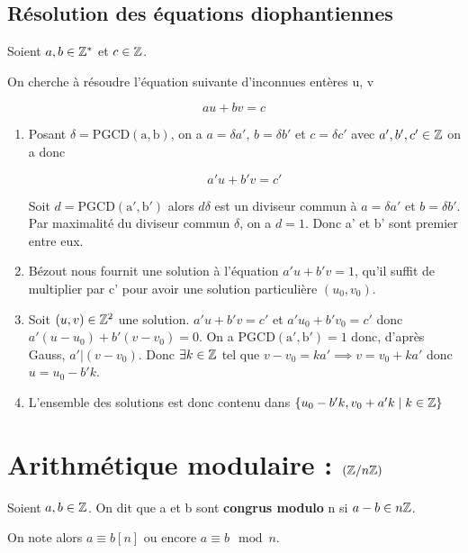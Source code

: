 \documentclass[a4paper, 12pt]{article}
\begin{document}
\subsection{Résolution des équations diophantiennes}

Soient $a, b \in \mathbb{Z}^*$ et $c \in \mathbb{Z}$.

On cherche à résoudre l'équation suivante d'inconnues entères u, v

$$
au + bv = c
$$

\begin{methode}
    \begin{enumerate}
        \item Posant $\delta = \mathrm{PGCD(a, b)}$, on a $a = \delta a'$, $b = \delta b'$ et $c = \delta c'$ avec $a', b', c' \in \mathbb{Z}$
        on a donc
        
        $$
        a'u + b'v = c'
        $$
        
        Soit $d = \mathrm{PGCD(a', b')}$ alors $d\delta$ est un diviseur commun à $a = \delta a'$ et $b = \delta b'$.
        Par maximalité du diviseur commun $\delta$, on a $d = 1$. Donc a' et b' sont premier entre eux.
        \item Bézout nous fournit une solution à l'équation $a'u + b'v = 1$, qu'il suffit de multiplier
        par c' pour avoir une solution particulière $(u_0, v_0)$.
        \item Soit $(u, v) \in \mathbb{Z}^2$ une solution. $a'u + b'v = c'$ et $a'u_0 + b'v_0 = c'$ donc $a'(u - u_0) + b'(v - v_0) = 0$.
        On a $\mathrm{PGCD(a', b')}= 1$ donc, d'après Gauss, $a' | (v - v_0)$. Donc $\exists k \in \mathbb{Z}$ tel que $v - v_0 = ka' \implies v = v_0 + ka'$ donc $u = u_0 - b'k$.
        \item L'ensemble des solutions est donc contenu dans $\{u_0 - b'k, v_0 + a'k \mid k \in \mathbb{Z}\}$
    \end{enumerate}
\end{methode}




\section{Arithmétique modulaire : $(\mathbb{Z}/n\mathbb{Z})$}

\begin{definition}
    Soient $a, b \in \mathbb{Z}$. On dit que a et b sont \textbf{congrus modulo} n si $a - b \in n\mathbb{Z}$.
    
    On note alors $a \equiv b [n]$ ou encore $a \equiv b \mod n$.
\end{definition}
\end{document}

